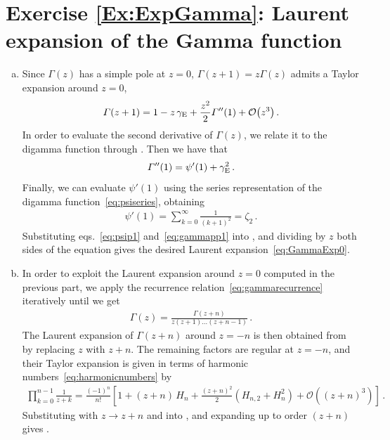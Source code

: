 \section*{Exercise \ref{Ex:ExpGamma}: Laurent expansion of the Gamma function}
\label{Sol:ExpGamma}
\begin{enumerate}[a)]

\item Since $\Gamma(z)$ has a simple pole at $z=0$, $\Gamma(z+1) = z \Gamma(z)$ admits a Taylor expansion around $z=0$,
\begin{align} \label{eq:Gammazp1exp}
\Gamma(z+1) = 1 - z \, \euler + \frac{z^2}{2} \Gamma''(1) + \mathcal{O}\bigl(z^3\bigr) \,.
\end{align}
In order to evaluate the second derivative of $\Gamma(z)$, we relate it to the digamma function through . Then we have that
\begin{align} \label{eq:gammapp1}
\Gamma''(1) = \psi'(1) + \euler^2 \,.
\end{align}
Finally, we can evaluate $\psi'(1)$ using the series representation of the digamma function~\eqref{eq:psiseries}, obtaining
\begin{align} \label{eq:psip1}
\psi'(1) = \sum_{k=0}^{\infty} \frac{1}{(k+1)^2} = \zeta_2 \,.
\end{align}
Substituting eqs.~\eqref{eq:psip1} and~\eqref{eq:gammapp1} into , and dividing by $z$ both sides of the equation gives the desired Laurent expansion~\eqref{eq:GammaExp0}.

\smallskip

\item In order to exploit the Laurent expansion around $z=0$ computed in the previous part, we apply the recurrence relation~\eqref{eq:gammarecurrence} iteratively until we get
\begin{align} \label{eq:gammaznrec}
\Gamma(z) =  \frac{\Gamma(z+n)}{z(z+1) \ldots (z+n-1) }  \,.
\end{align}
The Laurent expansion of $\Gamma(z+n)$ around $z=-n$ is then obtained from  by replacing $z$ with $z+n$.
The remaining factors are regular at $z=-n$, and their Taylor expansion is given in terms of harmonic numbers~\eqref{eq:harmonicnumbers} by
\begin{align} \label{eq:factorsexp}
\prod_{k=0}^{n-1} \frac{1}{z+k}  =  \frac{(-1)^n}{n!} \left[ 1 + (z+n) \, H_n + \frac{(z+n)^2}{2} \left( H_{n,2} + H_n^2 \right) + \mathcal{O}\left((z+n)^3\right) \right] \,.
\end{align}
Substituting  with $z \to z+n$ and  into , and expanding up to order $(z+n)$ gives .

\end{enumerate}

